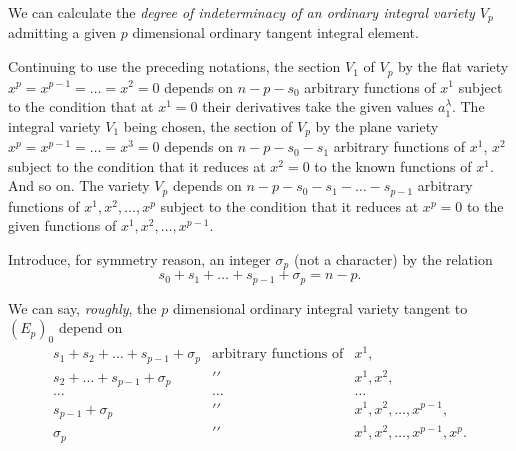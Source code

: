 \documentclass[leqno,11pt]{book}
\numberwithin{equation}{chapter}
\theoremstyle{shape1}
\theoremstyle{shape0}
\theoremstyle{shape2}
\theoremstyle{definition}
\begin{document}
We can calculate the \emph{degree of indeterminacy of an ordinary integral variety $V_{p}$} admitting a given $p$ dimensional ordinary tangent integral element.

Continuing to use the preceding notations, the section $V_{1}$ of $V_{p}$ by the flat variety $x^{p}=x^{p-1}=\dots=x^{2}=0$ depends on $n-p-s_{0}$ arbitrary functions of $x^{1}$ subject to the condition that at $x^{1}=0$ their derivatives take the given values $a_{1}^{\lambda}$. The integral variety $V_{1}$ being chosen, the section of $V_{p}$ by the plane variety $x^{p}=x^{p-1}=\dots=x^{3}=0$ depends on $n-p-s_{0}-s_{1}$ arbitrary functions of $x^{1}$, $x^{2}$ subject to the condition that it reduces at $x^{2}=0$ to the known functions of $x^{1}$. And so on. The variety $V_{p}$ depends on $n-p-s_{0}-s_{1}-\dots-s_{p-1}$ arbitrary functions of $x^{1},x^{2},\dots,x^{p}$ subject to the condition that it reduces at $x^{p}=0$ to the given functions of $x^{1},x^{2},\dots,x^{p-1}$.

Introduce, for symmetry reason, an integer $\sigma_{p}$ (not a character) by the relation
\[
s_{0}+s_{1}+\dots+s_{p-1}+\sigma_{p}=n-p.
\]

We can say, \emph{roughly}, the $p$ dimensional ordinary integral variety tangent to $(E_{p})_{0}$ depend on
\[\begin{array}{rcl}
  s_{1}+s_{2}+\dots+s_{p-1}+\sigma_{p}&\text{arbitrary functions of}& x^{1},\\
  s_{2}+\dots+s_{p-1}+\sigma_{p}&\prime\prime& x^{1},x^{2},\\
  \dots&\dots&\dots\\
  s_{p-1}+\sigma_{p}&\prime\prime& x^{1},x^{2},\dots,x^{p-1},\\
  \sigma_{p}&\prime\prime& x^{1},x^{2},\dots,x^{p-1},x^{p}.\\
\end{array}\]
\end{document}
